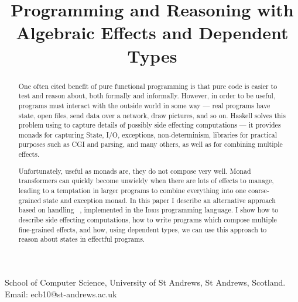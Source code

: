 \documentclass[preprint]{sigplanconf}
\newcounter{per}
\newcommand{\Idris}{\textsc{Idris}}
\begin{document}
\title{Programming and Reasoning with Algebraic Effects and Dependent Types}
{School of Computer Science, 
University of St Andrews, St Andrews, Scotland.}
{Email: ecb10@st-andrews.ac.uk}

\maketitle

\begin{abstract}
One often cited benefit of pure functional programming is that pure code is
easier to test and reason about, both formally and informally. However, in
order to be useful, programs must interact with the outside world in some way
--- real programs have state, open files, send data over a network, draw
pictures, and so on. Haskell solves this problem using  to capture
details of possibly side effecting computations --- it provides monads for
capturing State, I/O, exceptions, non-determinism, libraries for practical
purposes such as CGI and parsing, and many others, as well as  for combining multiple effects.

Unfortunately, useful as monads are, they do not compose very well. Monad
transformers can quickly become unwieldy when there are lots of effects to
manage, leading to a temptation in larger programs to combine everything into
one coarse-grained state and exception monad. In this paper I describe an
alternative approach based on handling ~, implemented
in the \Idris{} programming language. I show how to describe side effecting
computations, how to write programs which compose multiple fine-grained
effects, and how, using dependent types, we can use this approach to reason
about states in effectful programs.
\end{abstract}




%

%

%


\end{document}
